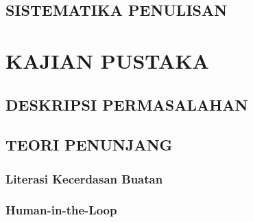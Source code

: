 \documentclass[12pt,a4paper,oneside,openany]{report}
\begin{document}
\section{SISTEMATIKA PENULISAN}
\label{sec:sistematika-penulisan}

\chapter{KAJIAN PUSTAKA}
\label{chap:bab2}


\section{DESKRIPSI PERMASALAHAN}
\label{sec:deskripsi-permasalahan}

\section{TEORI PENUNJANG}
\label{sec:teori-penunjang}

\subsection{Literasi Kecerdasan Buatan}
\label{subsec:literasi-ai}

\subsection{Human-in-the-Loop}
\label{subsec:hitl}
\end{document}
